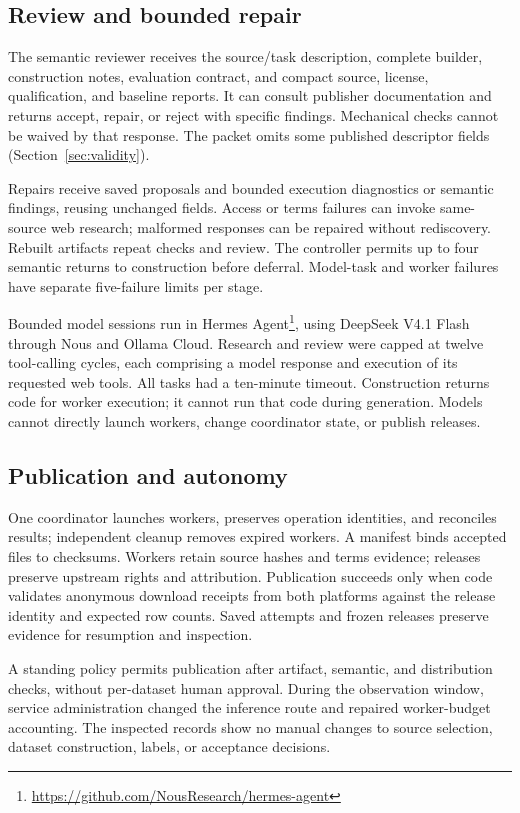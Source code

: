 \documentclass[conference,10pt,letterpaper]{IEEEtran}
\begin{document}
\subsection{Review and bounded repair}
The semantic reviewer receives the source/task description, complete builder, construction notes, evaluation contract, and compact source, license, qualification, and baseline reports. It can consult publisher documentation and returns accept, repair, or reject with specific findings. Mechanical checks cannot be waived by that response. The packet omits some published descriptor fields (Section~\ref{sec:validity}).

Repairs receive saved proposals and bounded execution diagnostics or semantic findings, reusing unchanged fields. Access or terms failures can invoke same-source web research; malformed responses can be repaired without rediscovery. Rebuilt artifacts repeat checks and review. The controller permits up to four semantic returns to construction before deferral. Model-task and worker failures have separate five-failure limits per stage.

Bounded model sessions run in Hermes Agent\footnote{\url{https://github.com/NousResearch/hermes-agent}}, using DeepSeek V4.1 Flash through Nous and Ollama Cloud. Research and review were capped at twelve tool-calling cycles, each comprising a model response and execution of its requested web tools. All tasks had a ten-minute timeout. Construction returns code for worker execution; it cannot run that code during generation. Models cannot directly launch workers, change coordinator state, or publish releases.

\subsection{Publication and autonomy}
One coordinator launches workers, preserves operation identities, and reconciles results; independent cleanup removes expired workers. A manifest binds accepted files to checksums. Workers retain source hashes and terms evidence; releases preserve upstream rights and attribution. Publication succeeds only when code validates anonymous download receipts from both platforms against the release identity and expected row counts. Saved attempts and frozen releases preserve evidence for resumption and inspection.

A standing policy permits publication after artifact, semantic, and distribution checks, without per-dataset human approval. During the observation window, service administration changed the inference route and repaired worker-budget accounting. The inspected records show no manual changes to source selection, dataset construction, labels, or acceptance decisions.
\end{document}
